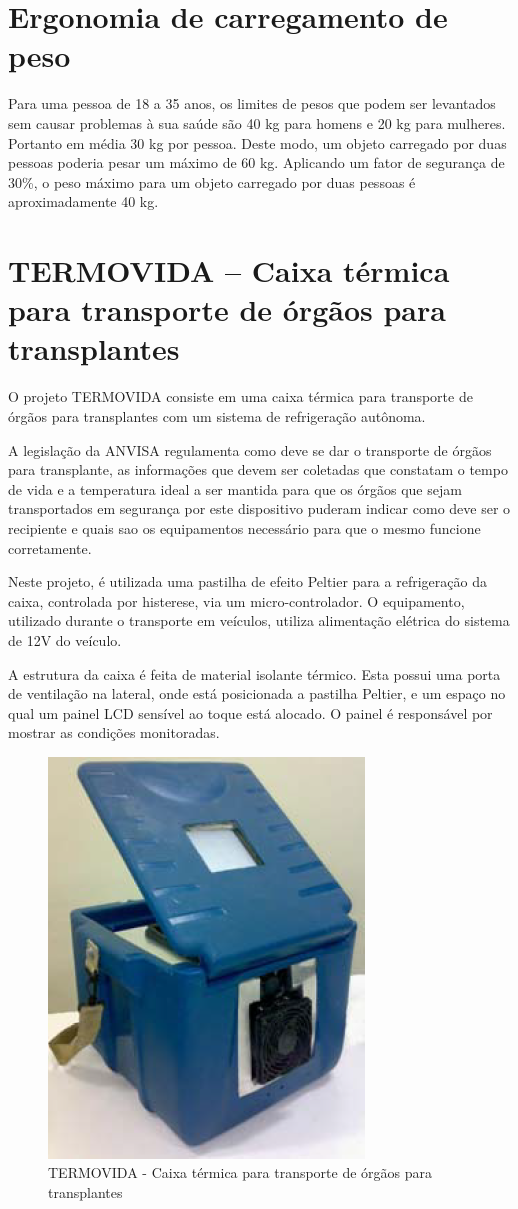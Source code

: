 \section{Ergonomia de carregamento de peso}

Para uma pessoa de 18 a 35 anos, os limites de pesos que podem ser levantados sem causar problemas à sua saúde são 40 kg para homens e 20 kg para mulheres. Portanto em média 30 kg por pessoa. Deste modo, um objeto carregado por duas pessoas poderia pesar um máximo de 60 kg. Aplicando um fator de segurança de 30\%, o peso máximo para um objeto carregado por duas pessoas é aproximadamente 40 kg.

\section{TERMOVIDA – Caixa térmica para transporte de órgãos para transplantes}

O projeto TERMOVIDA consiste em uma caixa térmica para transporte de órgãos para transplantes com um sistema de refrigeração autônoma.

A legislação da ANVISA regulamenta como deve se dar o transporte de órgãos para transplante, as informações que devem ser coletadas que constatam o tempo de vida e a temperatura ideal a ser mantida para que os órgãos que sejam transportados em segurança por este dispositivo puderam indicar como deve ser o recipiente e quais sao os equipamentos necessário para que o mesmo funcione corretamente.

Neste projeto, é utilizada uma pastilha de efeito Peltier para a refrigeração da caixa, controlada por histerese, via um micro-controlador. O equipamento, utilizado durante o transporte em veículos, utiliza alimentação elétrica do sistema de 12V do veículo.

A estrutura da caixa é feita de material isolante térmico. Esta possui uma porta de ventilação na lateral, onde está posicionada a pastilha Peltier, e um espaço no qual um painel LCD sensível ao toque está alocado. O painel é responsável por mostrar as condições monitoradas.

\begin{figure}[H]
\centering
\includegraphics[scale=1]{figuras/termovida.png}
\caption{TERMOVIDA - Caixa térmica para transporte de órgãos para transplantes}
\end{figure}
